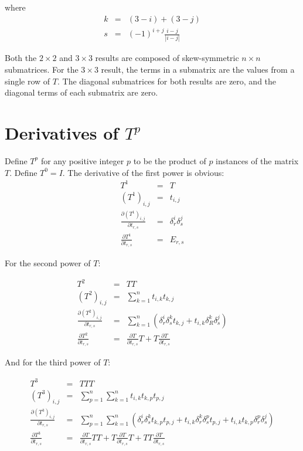 \documentclass{report}
\begin{document}
where 
\begin{eqnarray}
k &=& (3-i) + (3-j) \\
s &=& (-1)^{i+j}\frac{i-j}{|i-j|}
\end{eqnarray}

Both the $2 \times 2$ and $3 \times 3$ results are composed of skew-symmetric $n \times n$ submatrices.  For the $3 \times 3$ result, the terms in a submatrix are the values from a single row of $T$.  The diagonal submatrices for both results are zero, and the diagonal terms of each submatrix are zero.


\section{Derivatives of $T^p$}

Define $T^p$ for any positive integer $p$ to be the product of $p$ instances of the matrix $T$.  Define $T^0 = I$.  The derivative of the first power is obvious:
\begin{eqnarray}
T^1 &=& T \\
(T^1)_{i,j} &=& t_{i,j} \\
\frac{\partial (T^1)_{i,j}}{\partial t_{r,s}} &=& \delta^i_r \delta^j_s \\
\frac{\partial T^1}{\partial t_{r,s}} &=& E_{r,s}
\end{eqnarray}

For the second power of $T$:

\begin{eqnarray}
T^2 &=& T T \\
(T^2)_{i,j} &=& \sum_{k=1}^n t_{i,k} t_{k,j} \\
\frac{\partial (T^2)_{i,j}}{\partial t_{r,s}} &=& 
  \sum_{k=1}^n \left( \delta^i_r \delta^k_s t_{k,j} 
  + t_{i,k} \delta^k_R \delta^j_s 
  \right) \\
\frac{\partial T^2}{\partial t_{r,s}} &=& \frac{\partial T}{\partial t_{r,s}} T 
  + T \frac{\partial T}{\partial t_{r,s}} 
\end{eqnarray}

And for the third power of $T$:

\begin{eqnarray}
T^3 &=& T T T\\
(T^3)_{i,j} &=& \sum_{p=1}^n \sum_{k=1}^n t_{i,k} t_{k,p} t_{p,j} \\
\frac{\partial (T^3)_{i,j}}{\partial t_{r,s}} &=& 
  \sum_{p=1}^n \sum_{k=1}^n \left( 
  \delta^i_r \delta^k_s t_{k,p} t_{p,j} 
  + t_{i,k} \delta^k_r \delta^p_s t_{p,j} 
  + t_{i,k} t_{k,p} \delta^p_r \delta^j_s 
  \right)\\
\frac{\partial T^3}{\partial t_{r,s}} &=& \frac{\partial T}{\partial t_{r,s}} T T + T \frac{\partial T}{\partial t_{r,s}} T + T T \frac{\partial T}{\partial t_{r,s}} 
\end{eqnarray}
\end{document}
